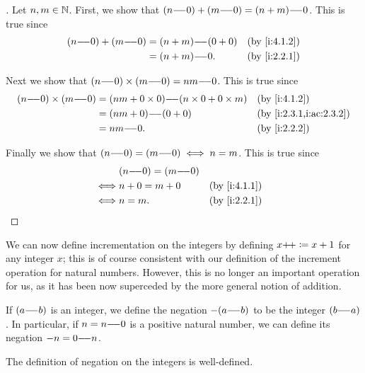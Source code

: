 \begin{proof}[]
  Let \(n, m \in \mathbb{N}\).
  First, we show that \((n {-}\!{-} 0) + (m {-}\!{-} 0) = (n + m) {-}\!{-} 0\).
  This is true since
  \begin{align*}
    (n \mm 0) + (m \mm 0) & = (n + m) \mm (0 + 0) &  & \by{i:4.1.2} \\
                          & = (n + m) \mm 0.      &  & \by{i:2.2.1}
  \end{align*}

  Next we show that \((n {-}\!{-} 0) \times (m {-}\!{-} 0) = nm {-}\!{-} 0\).
  This is true since
  \begin{align*}
    (n \mm 0) \times (m \mm 0) & = (nm + 0 \times 0) \mm (n \times 0 + 0 \times m) &  & \by{i:4.1.2}            \\
                               & = (nm + 0) \mm (0 + 0)                            &  & \by{i:2.3.1,i:ac:2.3.2} \\
                               & = nm \mm 0.                                       &  & \by{i:2.2.2}
  \end{align*}

  Finally we show that \((n {-}\!{-} 0) = (m {-}\!{-} 0) \iff n = m\).
  This is true since
  \begin{align*}
         & (n \mm 0) = (m \mm 0)                   \\
    \iff & n + 0 = m + 0         &  & \by{i:4.1.1} \\
    \iff & n = m.                &  & \by{i:2.2.1}
  \end{align*}
\end{proof}

\begin{note}
  We can now define incrementation on the integers by defining \(x{+}\!{+} \coloneqq x + 1\) for any integer \(x\);
  this is of course consistent with our definition of the increment operation for natural numbers.
  However, this is no longer an important operation for us, as it has been now superceded by the more general notion of addition.
\end{note}

\begin{defn}\label{i:4.1.4}
  If \((a {-}\!{-} b)\) is an integer, we define the negation \(-(a {-}\!{-} b)\) to be the integer \((b {-}\!{-} a)\).
  In particular, if \(n = n {-}\!{-} 0\) is a positive natural number, we can define its negation \(-n = 0 {-}\!{-} n\).
\end{defn}

\begin{ac}\label{i:ac:4.1.3}
  The definition of negation on the integers is well-defined.
\end{ac}

